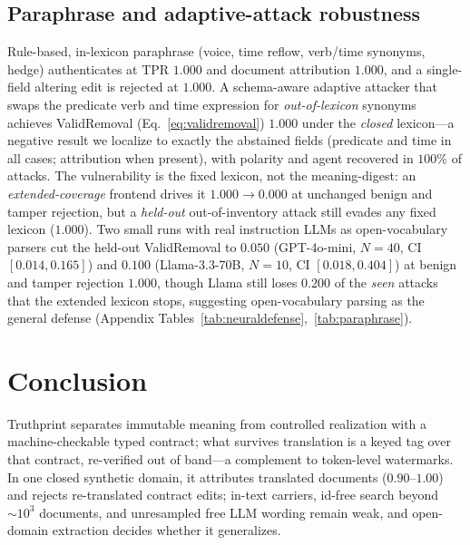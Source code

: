 \documentclass[11pt]{article}
\begin{document}
\subsection{Paraphrase and adaptive-attack robustness}
\label{sec:paraphrase}
Rule-based, in-lexicon paraphrase (voice, time reflow, verb/time synonyms, hedge) authenticates at TPR $1.000$ and document attribution $1.000$, and a single-field altering edit is rejected at $1.000$. A schema-aware adaptive attacker that swaps the predicate verb and time expression for \emph{out-of-lexicon} synonyms achieves ValidRemoval (Eq.~\eqref{eq:validremoval}) $1.000$ under the \emph{closed} lexicon---a negative result we localize to exactly the abstained fields (predicate and time in all cases; attribution when present), with polarity and agent recovered in $100\%$ of attacks. The vulnerability is the fixed lexicon, not the meaning-digest: an \emph{extended-coverage} frontend drives it $1.000\!\to\!0.000$ at unchanged benign and tamper rejection, but a \emph{held-out} out-of-inventory attack still evades any fixed lexicon ($1.000$). Two small runs with real instruction LLMs as open-vocabulary parsers cut the held-out ValidRemoval to $0.050$ (GPT-4o-mini, $N{=}40$, CI $[0.014,0.165]$) and $0.100$ (Llama-3.3-70B, $N{=}10$, CI $[0.018,0.404]$) at benign and tamper rejection $1.000$, though Llama still loses $0.200$ of the \emph{seen} attacks that the extended lexicon stops, suggesting open-vocabulary parsing as the general defense (Appendix Tables~\ref{tab:neuraldefense},~\ref{tab:paraphrase}).

\section{Conclusion}
Truthprint separates immutable meaning from controlled realization with a machine-checkable typed contract; what survives translation is a keyed tag over that contract, re-verified out of band---a complement to token-level watermarks. In one closed synthetic domain, it attributes translated documents ($0.90$--$1.00$) and rejects re-translated contract edits; in-text carriers, id-free search beyond ${\sim}10^3$ documents, and unresampled free LLM wording remain weak, and open-domain extraction decides whether it generalizes.
\end{document}
